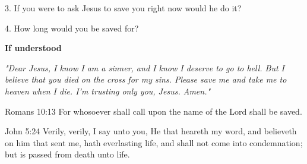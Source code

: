   3. If you were to ask Jesus to save you right now would he do it?

  4. How long would you be saved for?

\textbf{If understood}

{\em "Dear Jesus, I know I am a sinner, and I know I deserve to go to hell.  But I
believe that you died on the cross for my sins. Please save me and take me to
heaven when I die. I'm trusting only you, Jesus. Amen." }

Romans 10:13 For whosoever shall call upon the name of the Lord shall be saved.

John 5:24 Verily, verily, I say unto you, He that heareth my word, and
believeth on him that sent me, hath everlasting life, and shall not come into
condemnation; but is passed from death unto life.

